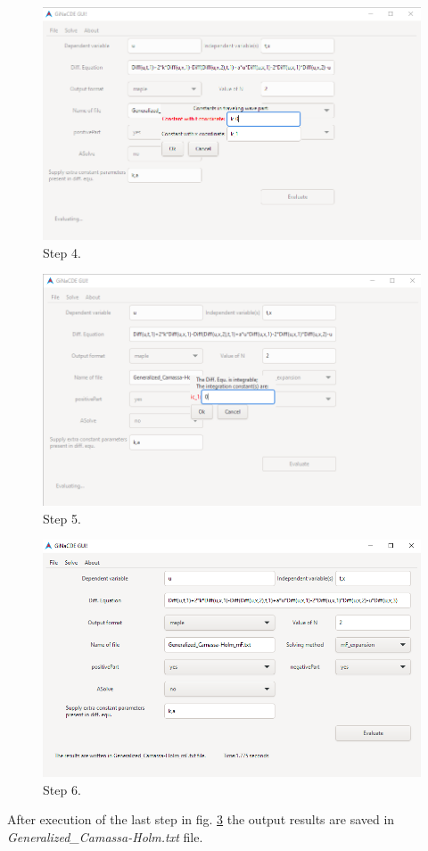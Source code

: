 \documentclass[11pt,a4paper,titlepage]{article}
\begin{document}
\begin{figure}[H]
	\centering
	\includegraphics[width=\linewidth]{Ex2step4}
	\caption{ Step 4. }
	\label{fig:Ex2step4}
\end{figure}

\begin{figure}[H]
	\centering
	\includegraphics[width=\linewidth]{Ex2step5}
	\caption{ Step 5. }
	\label{fig:Ex2step5}
\end{figure}

\begin{figure}[H]
	\centering
	\includegraphics[width=\linewidth]{Ex2step6}
	\caption{ Step 6. }
	\label{fig:Ex2step6}
\end{figure}
After execution of the last step in fig. \ref{fig:Ex2step6} the output results are saved in \emph{Generalized\_Camassa-Holm.txt} file.
\end{document}

